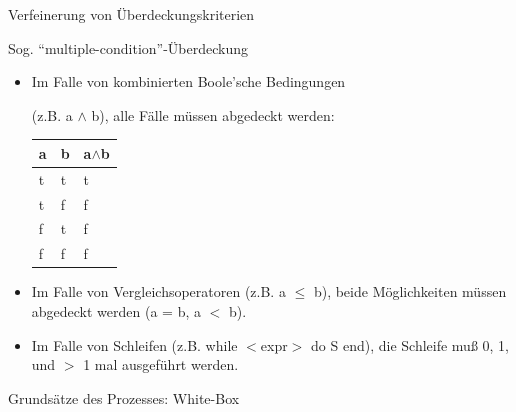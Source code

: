 \newpage
\centerline{Verfeinerung von \"Uberdeckungskriterien}
\bigskip

Sog. ``multiple-condition''-\"Uberdeckung

\begin{itemize}

\item Im Falle von kombinierten Boole'sche Bedingungen

(z.B. a $\wedge$ b), alle F\"alle m\"ussen abgedeckt werden:

\begin{center}
\begin{tabular}{p{2cm}|p{2cm}||p{2cm}}
\hline
a & b & a$\wedge$b \\
\hline
\hline
t & t & t \\
t & f & f\\
f & t & f\\
f & f & f\\
\hline
\end{tabular}
\end{center}

\item Im Falle von Vergleichsoperatoren (z.B. a $\leq$ b), 
beide M\"oglichkeiten m\"ussen abgedeckt werden (a = b, a $<$ b).

\item Im Falle von Schleifen (z.B. while $<$expr$>$ do S end),
die Schleife mu{\ss} 0, 1, und $>$ 1 mal ausgef\"uhrt werden.

\end{itemize}

\newpage
\centerline{Grunds\"atze des Prozesses: White-Box}
\bigskip

